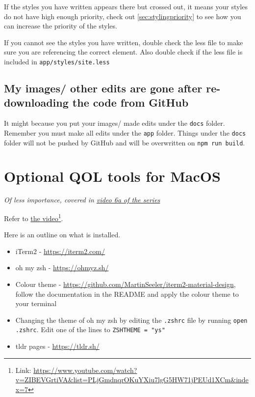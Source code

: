 If the styles you have written appears there but crossed out, it means your styles do not have high enough priority, check out \cref{sec:stylingpriority} to see how you can increase the priority of the styles.

If you cannot see the styles you have written, double check the less file to make sure you are referencing the correct element. Also double check if the less file is included in \texttt{app/styles/site.less}

\subsection{My images/ other edits are gone after re-downloading the code from GitHub}

It might because you put your images/ made edits under the \texttt{docs} folder. Remember you must make all edits under the \texttt{app} folder. Things under the \texttt{docs} folder will not be pushed by GitHub and will be overwritten on \texttt{npm run build}.

\section{Optional QOL tools for MacOS}
\label{sec:iterm}
\textit{Of less importance, covered in \href{https://www.youtube.com/watch?v=ZIBEVGrtiVA&list=PLjGmdnqrOKuYXiu7lgG5HW71jPEUd1XCm&index=7}{video 6a of the series}}
\vspace{6mm}

Refer to \href{https://www.youtube.com/watch?v=ZIBEVGrtiVA&list=PLjGmdnqrOKuYXiu7lgG5HW71jPEUd1XCm&index=7}{the video}\footnote{Link: \url{https://www.youtube.com/watch?v=ZIBEVGrtiVA&list=PLjGmdnqrOKuYXiu7lgG5HW71jPEUd1XCm&index=7}}.

Here is an outline on what is installed.
\begin{itemize}
    \item iTerm2 - \url{https://iterm2.com/}
    \item oh my zsh - \url{https://ohmyz.sh/}
    \item Colour theme - \url{https://github.com/MartinSeeler/iterm2-material-design}, follow the documentation in the README and apply the colour theme to your terminal
    \item Changing the theme of oh my zsh by editing the \texttt{.zshrc} file by running \texttt{open .zshrc}. Edit one of the lines to \texttt{ZSH\textunderscore THEME = "ys"} 
    \item tldr pages - \url{https://tldr.sh/}

\end{itemize}

